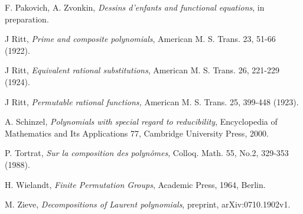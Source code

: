 \documentclass{amsart}
\begin{document}
\begin{thebibliography}{10}
 F. Pakovich, A. Zvonkin, \textit{Dessins d'enfants and functional equations},
in preparation.

 J Ritt,
\textit{Prime and composite polynomials},
American M. S. Trans. 23, 51-66 (1922).

 J Ritt,
\textit{Equivalent rational substitutions},
American M. S. Trans. 26, 221-229 (1924).

 J Ritt,
\textit{Permutable rational functions,}
American M. S. Trans. 25, 399-448 (1923).

 A. Schinzel, \textit{Polynomials with special regard to
reducibility}, Encyclopedia of Mathematics and Its Applications
77, Cambridge University Press, 2000.

 P. Tortrat, \textit{Sur la composition des polyn\^omes},
Colloq. Math. 55, No.2, 329-353 (1988).

 H. Wielandt,
\textit{Finite Permutation Groups},
 Academic Press, 1964, Berlin.

 M. Zieve, \textit{Decompositions of Laurent polynomials}, preprint, arXiv:0710.1902v1.

\end{thebibliography}
\end{document}
